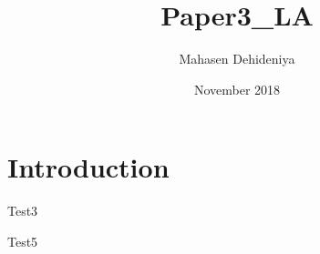 \documentclass{article}
\title{Paper3_LA}
\author{Mahasen Dehideniya}
\date{November 2018}
\begin{document}
\maketitle

\section{Introduction}
Test3

Test5
\end{document}
